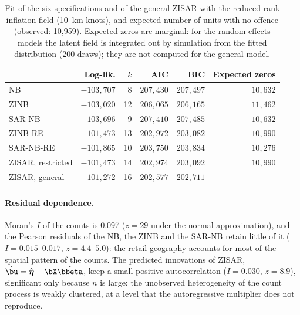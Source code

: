 \begin{table}[htbp]
\centering
\caption{Fit of the six specifications and of the general ZISAR with the reduced-rank inflation field (10~km knots), and expected number of units with no offence (observed: 10{,}959). Expected zeros are marginal: for the random-effects models the latent field is integrated out by simulation from the fitted distribution (200 draws); they are not computed for the general model.}\label{tab:crime_fit}
\small
\begin{tabular}{lrrrrr}
\toprule
 & Log-lik. & $k$ & AIC & BIC & Expected zeros \\
\midrule
NB        & $-103{,}707$ & 8  & $207{,}430$ & $207{,}497$ & $10{,}632$ \\
ZINB      & $-103{,}020$ & 12 & $206{,}065$ & $206{,}165$ & $11{,}462$ \\
SAR-NB    & $-103{,}696$ & 9  & $207{,}410$ & $207{,}485$ & $10{,}632$ \\
ZINB-RE   & $-101{,}473$ & 13 & $202{,}972$ & $203{,}082$ & $10{,}990$ \\
SAR-NB-RE & $-101{,}865$ & 10 & $203{,}750$ & $203{,}834$ & $10{,}276$ \\
ZISAR, restricted & $-101{,}473$ & 14 & $202{,}974$ & $203{,}092$ & $10{,}990$ \\
\midrule
ZISAR, general    & $-101{,}272$ & 16 & $202{,}577$ & $202{,}711$ & -- \\
\bottomrule
\end{tabular}
\end{table}

\paragraph{Residual dependence.}
Moran's $I$ of the counts is 0.097 ($z = 29$ under the normal approximation), and the Pearson residuals of the NB, the ZINB and the SAR-NB retain little of it ($I = 0.015$--$0.017$, $z = 4.4$--$5.0$): the retail geography accounts for most of the spatial pattern of the counts.
The predicted innovations of ZISAR, $\hat\bu = \hat{\boldsymbol\eta} - \bX\hat\bbeta$, keep a small positive autocorrelation ($I = 0.030$, $z = 8.9$), significant only because $n$ is large: the unobserved heterogeneity of the count process is weakly clustered, at a level that the autoregressive multiplier does not reproduce.

